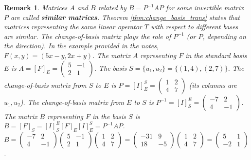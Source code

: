 \documentclass[11pt, a4paper]{article}
\theoremstyle{mydefinitionstyle}
\newtheorem{remark}{Remark}[section]
\theoremstyle{mytheoremstyle}
\begin{document}
\begin{remark}
    Matrices $A$ and $B$ related by $B = P^{-1}AP$ for some invertible matrix $P$ are called \textbf{similar matrices}. Theorem \ref{thm:change_basis_trans} states that matrices representing the same linear operator $T$ with respect to different bases are similar. The change-of-basis matrix plays the role of $P^{-1}$ (or $P$, depending on the direction).
    In the example provided in the notes, $F(x,y) = (5x-y, 2x+y)$. The matrix $A$ representing $F$ in the standard basis $E$ is $A = [F]_E = \begin{pmatrix} 5 & -1 \\ 2 & 1 \end{pmatrix}$.
    The basis $S = \{u_1, u_2\} = \{(1,4), (2,7)\}$. The change-of-basis matrix from $S$ to $E$ is $P = [I]_E^S = \begin{pmatrix} 1 & 2 \\ 4 & 7 \end{pmatrix}$ (its columns are $u_1, u_2$). The change-of-basis matrix from $E$ to $S$ is $P^{-1} = [I]_S^E = \begin{pmatrix} -7 & 2 \\ 4 & -1 \end{pmatrix}$.
    The matrix $B$ representing $F$ in the basis $S$ is $B = [F]_S = [I]_S^E [F]_E [I]_E^S = P^{-1}AP$.
    $B = \begin{pmatrix} -7 & 2 \\ 4 & -1 \end{pmatrix} \begin{pmatrix} 5 & -1 \\ 2 & 1 \end{pmatrix} \begin{pmatrix} 1 & 2 \\ 4 & 7 \end{pmatrix} = \begin{pmatrix} -31 & 9 \\ 18 & -5 \end{pmatrix} \begin{pmatrix} 1 & 2 \\ 4 & 7 \end{pmatrix} = \begin{pmatrix} 5 & 1 \\ -2 & 1 \end{pmatrix}$.
\end{remark}
\end{document}
